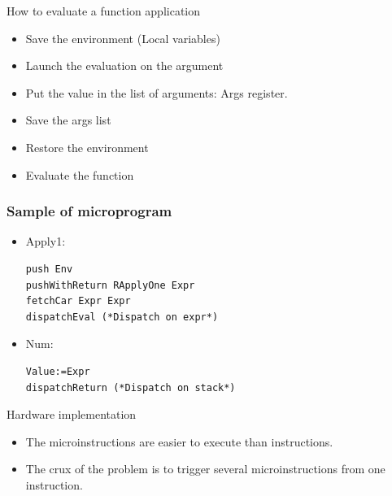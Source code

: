 \documentclass{beamer}
\begin{document}
\begin{frame}{How to evaluate a function application}
\begin{itemize}
\item Save the environment (Local variables)
\item Launch the evaluation on the argument
\item Put the value in the list of arguments: Args register.
\item Save the args list
\item Restore the environment
\item Evaluate the function
\end{itemize}
\end{frame}

\begin{frame}[fragile]
\frametitle{Sample of microprogram}
\begin{itemize}
\item Apply1:
\begin{lstlisting}
push Env 
pushWithReturn RApplyOne Expr
fetchCar Expr Expr
dispatchEval (*Dispatch on expr*) 
\end{lstlisting}
\item Num:
\begin{lstlisting}
Value:=Expr
dispatchReturn (*Dispatch on stack*)
\end{lstlisting}
\end{itemize}
\end{frame}

\begin{frame}{Hardware implementation}
\begin{itemize}
\item The microinstructions are easier to execute than instructions.  
\item The crux of the problem is to trigger several microinstructions from one
instruction.  
\end{itemize}
\end{frame}
\end{document}
